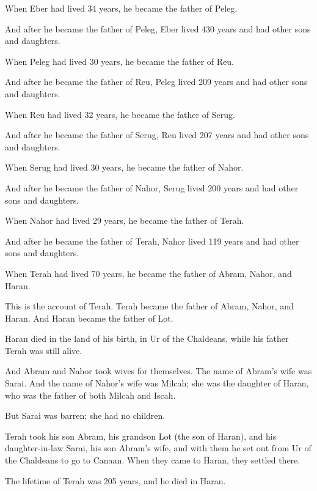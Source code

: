 \begin{scripture}
 When Eber had lived 34 years, he became the father of Peleg.
 And after he became the father of Peleg, Eber lived 430 years and had other sons and daughters.
\everypar{}

 When Peleg had lived 30 years, he became the father of Reu.
 And after he became the father of Reu, Peleg lived 209 years and had other sons and daughters.
\everypar{}

 When Reu had lived 32 years, he became the father of Serug.
 And after he became the father of Serug, Reu lived 207 years and had other sons and daughters.
\everypar{}

 When Serug had lived 30 years, he became the father of Nahor.
 And after he became the father of Nahor, Serug lived 200 years and had other sons and daughters.
\everypar{}

 When Nahor had lived 29 years, he became the father of Terah.
 And after he became the father of Terah, Nahor lived 119 years and had other sons and daughters.
\everypar{}

 When Terah had lived 70 years, he became the father of Abram, Nahor, and Haran.
\everypar{}

 This is the account of Terah. Terah became the father of Abram, Nahor, and Haran. And Haran became the father of Lot.
 Haran died in the land of his birth, in Ur of the Chaldeans, while his father Terah was still alive.
 And Abram and Nahor took wives for themselves. The name of Abram's wife was Sarai. And the name of Nahor's wife was Milcah; she was the daughter of Haran, who was the father of both Milcah and Iscah.
 But Sarai was barren; she had no children.
\everypar{}

 Terah took his son Abram, his grandson Lot (the son of Haran), and his daughter-in-law Sarai, his son Abram's wife, and with them he set out from Ur of the Chaldeans to go to Canaan. When they came to Haran, they settled there.
 The lifetime of Terah was 205 years, and he died in Haran.


\end{scripture}
